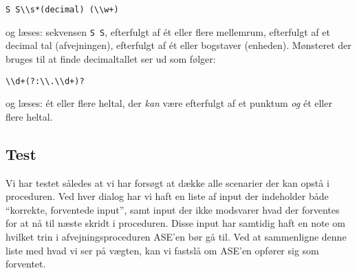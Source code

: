\documentclass[a4paper]{article}
\begin{document}
\begin{verbatim}
S S\\s*(decimal) (\\w+)
\end{verbatim}

og læses: sekvensen \texttt{S S}, efterfulgt af ét eller flere mellemrum, efterfulgt af et decimal tal (afvejningen), efterfulgt af ét eller bogstaver (enheden). Mønsteret der bruges til at finde decimaltallet ser ud som følger:
\begin{verbatim}
\\d+(?:\\.\\d+)? 
\end{verbatim}
og læses: ét eller flere heltal, der \emph{kan} være efterfulgt af et punktum \emph{og} ét eller flere heltal.



\subsection{Test} %

Vi har testet således at vi har forsøgt at dække alle scenarier der kan opstå i proceduren. Ved hver dialog har vi haft en liste af input der indeholder både ``korrekte, forventede input'', samt input der ikke modsvarer hvad der forventes for at nå til næste skridt i proceduren. Disse input har samtidig haft en note om hvilket trin i afvejningsproceduren ASE'en bør gå til. Ved at sammenligne denne liste med hvad vi ser på vægten, kan vi fastslå om ASE'en opfører sig som forventet.
\end{document}
